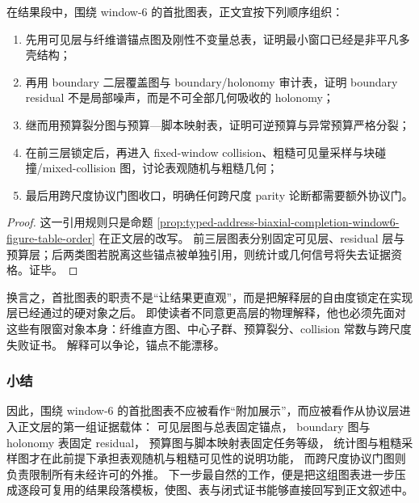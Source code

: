 \begin{proposition}\label{prop:typed-address-biaxial-completion-window6-figure-table-citation-rule}
在结果段中，围绕 window-\(6\) 的首批图表，正文宜按下列顺序组织：
\begin{enumerate}
  \item 先用可见层与纤维谱锚点图及刚性不变量总表，证明最小窗口已经是非平凡多壳结构；
  \item 再用 boundary 二层覆盖图与 boundary/holonomy 审计表，证明 boundary residual 不是局部噪声，而是不可全部几何吸收的 holonomy；
  \item 继而用预算裂分图与预算—脚本映射表，证明可逆预算与异常预算严格分裂；
  \item 在前三层锁定后，再进入 fixed-window collision、粗糙可见量采样与块碰撞/mixed-collision 图，讨论表观随机与粗糙几何；
  \item 最后用跨尺度协议门图收口，明确任何跨尺度 parity 论断都需要额外协议门。
\end{enumerate}
\end{proposition}

\begin{proof}
这一引用规则只是命题 \ref{prop:typed-address-biaxial-completion-window6-figure-table-order} 在正文层的改写。
前三层图表分别固定可见层、residual 层与预算层；后两类图若脱离这些锚点被单独引用，则统计或几何信号将失去证据资格。证毕。
\end{proof}

换言之，首批图表的职责不是“让结果更直观”，而是把解释层的自由度锁定在实现层已经通过的硬对象之后。
即使读者不同意更高层的物理解释，他也必须先面对这些有限窗对象本身：纤维直方图、中心子群、预算裂分、collision 常数与跨尺度失败证书。
解释可以争论，锚点不能漂移。

\subsubsection{小结}\label{subsubsec:typed-address-biaxial-completion-window6-figure-table-summary}
因此，围绕 window-\(6\) 的首批图表不应被看作“附加展示”，而应被看作从协议层进入正文层的第一组证据载体：
可见层图与总表固定锚点，
boundary 图与 holonomy 表固定 residual，
预算图与脚本映射表固定任务等级，
统计图与粗糙采样图才在此前提下承担表观随机与粗糙可见性的说明功能，
而跨尺度协议门图则负责限制所有未经许可的外推。
下一步最自然的工作，便是把这组图表进一步压成逐段可复用的结果段落模板，使图、表与闭式证书能够直接回写到正文叙述中。

